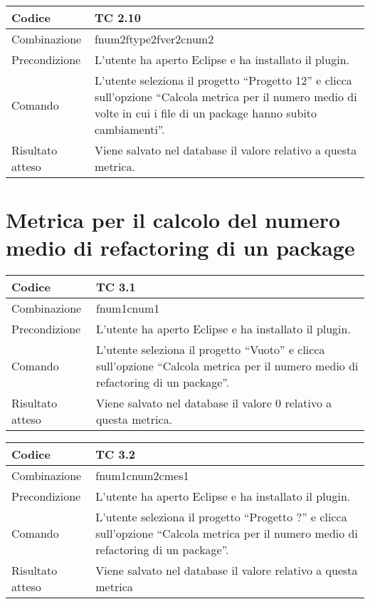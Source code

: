 \begin{table}[ht]
\begin{tabular}{|p{3cm}|p{9cm}|}
\hline
\cellcolor{lightgray}Codice				& TC 2.10								\\
\hline
\cellcolor{lightgray}Combinazione		& fnum2ftype2fver2cnum2									\\
\hline
\cellcolor{lightgray}Precondizione		& L'utente ha aperto Eclipse e ha installato il plugin.		\\
\hline
\cellcolor{lightgray}Comando			& L'utente seleziona il progetto ``Progetto 12''  e clicca sull'opzione ``Calcola metrica per il numero medio di volte in cui i file di un package hanno subito cambiamenti''.	\\
\hline
\cellcolor{lightgray}Risultato atteso	& Viene salvato nel database il valore relativo a questa metrica.\\
\hline
\end{tabular}
\end{table}
\clearpage

\section{Metrica per il calcolo del numero medio di refactoring di un package}
\begin{table}[ht]
\begin{tabular}{|p{3cm}|p{9cm}|}
\hline
\cellcolor{lightgray}Codice				& TC 3.1								\\
\hline
\cellcolor{lightgray}Combinazione		& fnum1cnum1									\\
\hline
\cellcolor{lightgray}Precondizione		& L'utente ha aperto Eclipse e ha installato il plugin.		\\
\hline
\cellcolor{lightgray}Comando			& L'utente seleziona il progetto ``Vuoto''  e clicca sull'opzione ``Calcola metrica per il numero medio di refactoring di un package''.	\\
\hline
\cellcolor{lightgray}Risultato atteso	& Viene salvato nel database il valore 0 relativo a questa metrica.\\
\hline
\end{tabular}
\end{table}

\begin{table}[ht]
\begin{tabular}{|p{3cm}|p{9cm}|}
\hline
\cellcolor{lightgray}Codice				& TC 3.2								\\
\hline
\cellcolor{lightgray}Combinazione		& fnum1cnum2cmes1 									\\
\hline
\cellcolor{lightgray}Precondizione		& L'utente ha aperto Eclipse e ha installato il plugin.				\\
\hline
\cellcolor{lightgray}Comando			& L'utente seleziona il progetto ``Progetto ?''  e clicca sull'opzione ``Calcola metrica per il numero medio di refactoring di un package''.	\\
\hline
\cellcolor{lightgray}Risultato atteso	& Viene salvato nel database il valore relativo a questa metrica	\\
\hline
\end{tabular}
\end{table}

